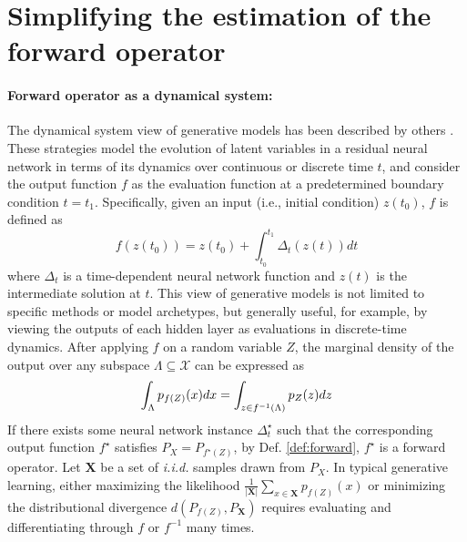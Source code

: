 \section{Simplifying the estimation of the forward operator}

\paragraph{Forward operator as a dynamical system:} 
The dynamical system view of generative models has been described by others \citep{Chen2018neuralode, grathwohl2018scalable, behrmann2019invertible}. 
These strategies model the evolution of latent variables in a residual neural network in 
terms of its dynamics over continuous or discrete time $t$, and consider the output function $f$ as the evaluation function at a predetermined boundary condition $t = t_1$. Specifically, given an input (i.e., initial condition) $z(t_0)$, $f$ is defined as
\begin{equation}
    f(z(t_0)) = z(t_0) + \int_{t_0}^{t_1} \Delta_t(z(t)) dt
\end{equation}
where $\Delta_t$ is a time-dependent neural network function and $z(t)$ is the intermediate solution at $t$. This view of generative models is not limited to specific methods or model archetypes, but generally useful, for example, by viewing the outputs of each hidden layer as evaluations in discrete-time dynamics. After applying $f$ on a random variable $Z$, the marginal density of the output over any subspace $\Lambda \subseteq \mathcal{X}$ can be expressed as
\begin{align}
\label{eq0}
\int_\Lambda p_{f(Z)}(x) dx = \int_{z \in {f}^{-1}(\Lambda)} p_{\var{z}}(z)dz
\end{align}
If there exists some neural network instance $\Delta^\star_t$ such that the corresponding output function $f^\star$ satisfies $P_X = P_{f^\star(Z)}$, by Def. \ref{def:forward}, $f^\star$ is a forward operator. Let $\mathbf{X}$ be a set of \textit{i.i.d.} samples drawn from $P_X$. In typical generative learning, either maximizing the likelihood $\tfrac{1}{|\mathbf{X}|}\sum_{x \in \mathbf{X}} p_{f(Z)}(x)$ or minimizing the distributional divergence $d(P_{f(Z)}, P_{\mathbf{X}})$ requires evaluating and differentiating through $f$ or $f^{-1}$ many times.


